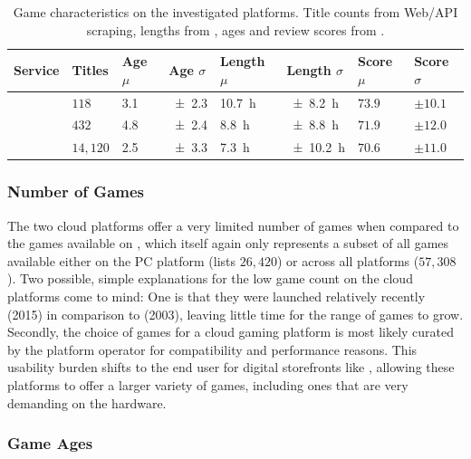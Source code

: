 \begin{table}
\centering
\caption{Game characteristics on the investigated platforms. Title counts from Web/API scraping, lengths from \hltb, ages and review scores from \metacritic.}
\label{tab:game-stats}
	\begin{tabu}{X[2]|X[r]X[r]X[r]X[r]X[r]X[r]X[r]}
	\toprule
	Service & Titles & Age $\mu$ & Age $\sigma$ & Length $\mu$ & Length $\sigma$ & Score $\mu$ & Score $\sigma$ \\
	\midrule
	\gfnow & $118$ & \SI{3.1}{\year} & \SI{\pm2.3}{\year} & \SI{10.7}{\hour} & \SI{\pm8.2}{\hour} & $73.9$ & $\pm10.1$ \\
	\psnow & $432$ & \SI{4.8}{\year} & \SI{\pm2.4}{\year} & \SI{8.8}{\hour} & \SI{\pm8.8}{\hour} & $71.9$ & $\pm12.0$ \\
	\steam & $14,120$ & \SI{2.5}{\year} & \SI{\pm3.3}{\year} & \SI{7.3}{\hour} & \SI{\pm10.2}{\hour} & $70.6$ & $\pm11.0$ \\
	\bottomrule
	\end{tabu}
\end{table}


\subsubsection{Number of Games}

The two cloud
platforms offer a very limited number of games when compared to the
games available on \steam, which itself again only represents a subset
of all games available either on the PC platform (\metacritic lists
$26,420$) or across all platforms ($57,308$). Two
possible, simple explanations for the low game count on the cloud
platforms come to mind: One is that they were launched relatively
recently (2015) in comparison to \steam (2003), leaving little time for
the range of games to grow. Secondly, the choice of games for a cloud
gaming platform is most likely curated by the platform operator for
compatibility and performance reasons. This usability burden shifts to
the end user for digital storefronts like \steam, allowing these
platforms to offer a larger variety of games, including ones that are
very demanding on the hardware.


\subsubsection{Game Ages}

